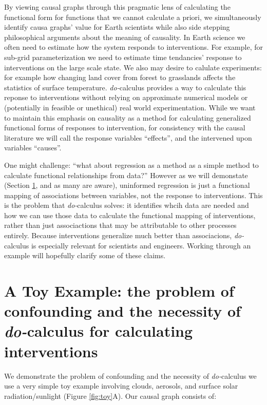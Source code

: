 \documentclass[12pt]{article}
\begin{document}
By viewing causal graphs through this pragmatic lens of calculating
the functional form for functions that we cannot calculate a priori,
we simultaneously identify causa graphs' value for Earth scientists
while also side stepping philosophical arguments about the meaning of
causality. In Earth science we often need to estimate how the system
responds to interventions. For example, for sub-grid parameterization
we need to estimate time tendancies' response to interventions on the
large scale state. We also may desire to calulate experiments: for
example how changing land cover from forest to grasslands affects the
statistics of surface temperature. \textit{do-}calculus provides a way
to calculate this reponse to interventions without relying on
approximate numerical models or (potentially in feasible or unethical)
real world experimentation. While we want to maintain this emphasis on
causality as a method for calculating generalized functional forms of
responses to intervention, for consistency with the causal literature
we will call the response variables ``effects'', and the intervened
upon variables ``causes''.

One might challenge: ``what about regression as a method as a simple
method to calculate functional relationships from data?'' However as
we will demonstate (Section \ref{sec:causal-graphs-pearls}, and as
many are aware), uninformed regression is just a functional mapping of
associations between variables, not the response to
interventions. This is the problem that \textit{do-}calculus solves:
it identifies whcih data are needed and how we can use those data to
calculate the functional mapping of interventions, rather than just
associactions that may be attributable to other processes
entirely. Because interventions generalize much better than
associacions, \textit{do-}calculus is especially relevant for
scientists and engineers. Working through an example will hopefully
clarify some of these claims.

\section{A Toy Example: the problem of confounding and the necessity
  of \textit{do-}calculus for calculating interventions}
\label{sec:causal-graphs-pearls}

We demonstrate the problem of confounding and the necessity of
\textit{do-}calculus we use a very simple toy example involving
clouds, aerosols, and surface solar radiation/sunlight (Figure
\ref{fig:toy}A). Our causal graph consists of:
\end{document}
